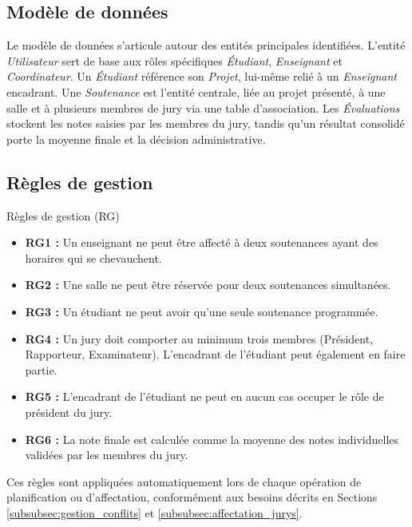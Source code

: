 \documentclass[12pt,a4paper]{article}
\begin{document}
\subsection{Modèle de données}
\label{subsec:modele_donnees}

Le modèle de données s'articule autour des entités principales identifiées.
L'entité \textit{Utilisateur} sert de base aux rôles spécifiques
\textit{Étudiant}, \textit{Enseignant} et \textit{Coordinateur}. Un
\textit{Étudiant} référence son \textit{Projet}, lui-même relié à un
\textit{Enseignant} encadrant. Une \textit{Soutenance} est l'entité centrale,
liée au projet présenté, à une salle et à plusieurs membres de jury via une
table d'association. Les \textit{Évaluations} stockent les notes saisies par les
membres du jury, tandis qu'un résultat consolidé porte la moyenne finale et la
décision administrative.

\subsection{Règles de gestion}
\label{subsec:regles}

\begin{projectbox}{Règles de gestion (RG)}
    \begin{itemize}[label=\textcolor{primary}{\textbullet}, leftmargin=1.5cm]
        \item \textbf{RG1 :} Un enseignant ne peut être affecté à deux
              soutenances ayant des horaires qui se chevauchent.
        \item \textbf{RG2 :} Une salle ne peut être réservée pour deux
              soutenances simultanées.
        \item \textbf{RG3 :} Un étudiant ne peut avoir qu'une seule soutenance
              programmée.
        \item \textbf{RG4 :} Un jury doit comporter au minimum trois membres (Président,
              Rapporteur, Examinateur). L'encadrant de l'étudiant peut également en
              faire partie.
        \item \textbf{RG5 :} L'encadrant de l'étudiant ne peut en aucun cas occuper
              le rôle de président du jury.
        \item \textbf{RG6 :} La note finale est calculée comme la moyenne des
              notes individuelles validées par les membres du jury.
    \end{itemize}
\end{projectbox}

Ces règles sont appliquées automatiquement lors de chaque opération de
planification ou d'affectation, conformément aux besoins décrits en Sections
\ref{subsubsec:gestion_conflits} et \ref{subsubsec:affectation_jurys}.
\end{document}

